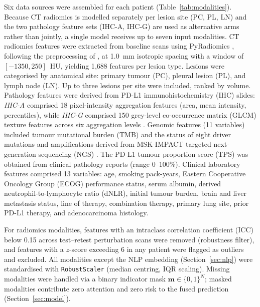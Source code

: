 Six data sources were assembled for each patient
(Table~\ref{tab:modalities}).
Because CT radiomics is modelled separately per lesion site (PC, PL, LN) and
the two pathology feature sets (IHC-A, IHC-G) are used as alternative arms
rather than jointly, a single model receives up to seven input modalities.
CT radiomics features were extracted from baseline scans using
PyRadiomics \cite{vanGriethuysen2017}, following the preprocessing of
\cite{Vanguri2022}, at 1.0~mm isotropic spacing with a window of
$[{-1350}, 250]$~HU, yielding 1{,}688 features per lesion type.
Lesions were categorised by anatomical site:
primary tumour (PC), pleural lesion (PL), and lymph node (LN).
Up to three lesions per site were included, ranked by volume.
Pathology features were derived from PD-L1 immunohistochemistry (IHC) slides:
\emph{IHC-A} comprised 18 pixel-intensity aggregation features
(area, mean intensity, percentiles), while
\emph{IHC-G} comprised 150 grey-level co-occurrence matrix (GLCM)
texture features across six aggregation levels \cite{Vanguri2022}.
Genomic features (11 variables) included tumour mutational burden (TMB) and
the status of eight driver mutations and amplifications derived from
MSK-IMPACT targeted next-generation sequencing (NGS) \cite{Cheng2015}.
The PD-L1 tumour proportion score (TPS) was obtained from clinical
pathology reports (range 0--100\%).
Clinical laboratory features comprised 13 variables:
age, smoking pack-years, Eastern Cooperative Oncology Group (ECOG)
performance status, serum albumin,
derived neutrophil-to-lymphocyte ratio (dNLR), initial tumour burden,
brain and liver metastasis status, line of therapy, combination therapy,
primary lung site, prior PD-L1 therapy, and adenocarcinoma histology.

For radiomics modalities, features with an intraclass correlation coefficient
(ICC) below 0.15 across test--retest perturbation scans were removed
(robustness filter), and features with a $z$-score exceeding 6 in any patient
were flagged as outliers and excluded.
All modalities except the NLP embedding (Section~\ref{sec:nlp}) were
standardised with \texttt{RobustScaler} (median centring, IQR scaling).
Missing modalities were handled via a binary indicator mask
$\mathbf{m} \in \{0,1\}^N$; masked modalities contribute zero attention and
zero risk to the fused prediction (Section~\ref{sec:model}).


